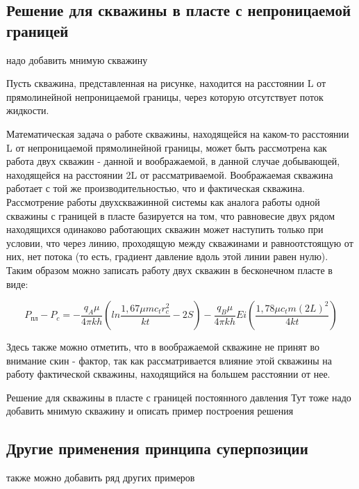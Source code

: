 \subsection{Решение для скважины в пласте с непроницаемой границей}
надо добавить мнимую скважину

Пусть скважина, представленная на рисунке, находится на расстоянии L от прямолинейной непроницаемой границы, через которую отсутствует поток жидкости.



Математическая задача о работе скважины, находящейся на каком-то расстоянии L от непроницаемой прямолинейной границы, может быть рассмотрена как  работа двух скважин - данной и воображаемой, в данной случае добывающей, находящейся на расстоянии 2L от рассматриваемой. Воображаемая скважина работает с той же производительностью, что и фактическая скважина. Рассмотрение работы двухскважинной системы как аналога работы одной скважины с границей в пласте базируется на том, что равновесие двух рядом находящихся одинаково работающих скважин может наступить только при условии, что через линию, проходящую между скважинами и равноотстоящую от них, нет потока (то есть, градиент давление вдоль этой линии равен нулю). Таким образом можно записать работу двух скважин в бесконечном пласте в виде:

$$ P_{пл} - P_c = - \frac{q_A \mu}{4\pi kh} \left( ln \frac{1,67 \mu m c_t r_c^2}{kt}-2S \right)- \frac{q_B \mu}{4\pi kh} Ei \left( \frac{1,78 \mu c_t m \left(2L\right)^2}{4kt} \right)$$

Здесь также можно отметить, что в воображаемой скважине не принят во внимание скин - фактор, так как рассматривается влияние этой скважины на работу фактической скважины, находящийся на большем расстоянии от нее. 



Решение для скважины в пласте с границей постоянного давления 
Тут тоже надо добавить мнимую скважину и описать пример построения решения


\subsection{Другие применения принципа суперпозиции}
также можно добавить ряд других примеров

